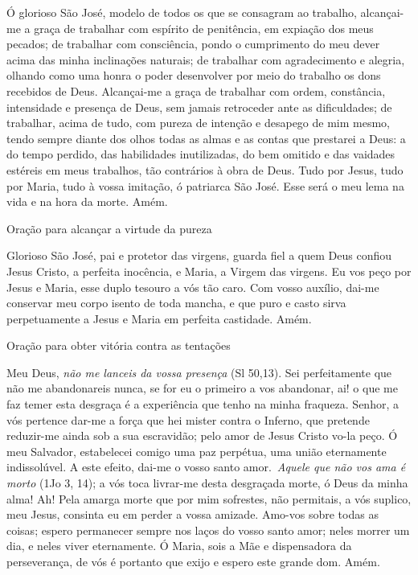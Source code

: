 \documentclass{book}
\begin{document}
\begin{flushleft}
    Ó glorioso São José, modelo de todos os que se consagram ao trabalho, alcançai-me a graça de trabalhar com espírito de penitência, em expiação dos meus pecados; de trabalhar com consciência, pondo o cumprimento do meu dever acima das minha inclinações naturais; de trabalhar com agradecimento e alegria, olhando como uma honra o poder desenvolver por meio do trabalho os dons recebidos de Deus. Alcançai-me a graça de trabalhar com ordem, constância, intensidade e presença de Deus, sem jamais retroceder ante as dificuldades; de trabalhar, acima de tudo, com pureza de intenção e desapego de mim mesmo, tendo sempre diante dos olhos todas as almas e as contas que prestarei a Deus: a do tempo perdido, das habilidades inutilizadas, do bem omitido e das vaidades estéreis em meus trabalhos, tão contrários à obra de Deus. Tudo por Jesus, tudo por Maria, tudo à vossa imitação, ó patriarca São José. Esse será o meu lema na vida e na hora da morte. Amém.
\end{flushleft}
\begin{center}
    Oração para alcançar a virtude da pureza
\end{center}
\begin{flushleft}
    Glorioso São José, pai e protetor das virgens, guarda fiel a quem Deus confiou Jesus Cristo, a perfeita inocência, e Maria, a Virgem das virgens. Eu vos peço por Jesus e Maria, esse duplo tesouro a vós tão caro. Com vosso auxílio, dai-me conservar meu corpo isento de toda mancha, e que puro e casto sirva perpetuamente a Jesus e Maria em perfeita castidade. Amém.
\end{flushleft}
\begin{center}
    Oração para obter vitória contra as tentações
\end{center}
\begin{flushleft}
    Meu Deus, \textit{não me lanceis da vossa presença} (\textcolor{VioletRed2}{Sl 50,13}). Sei perfeitamente que não me abandonareis nunca, se for eu o primeiro a vos abandonar, ai! o que me faz temer esta desgraça é a experiência que tenho na minha fraqueza. Senhor, a vós pertence dar-me a força que hei mister contra o Inferno, que pretende reduzir-me ainda sob a sua escravidão; pelo amor de Jesus Cristo vo-la peço. Ó meu Salvador, estabelecei comigo uma paz perpétua, uma união eternamente indissolúvel. A este efeito, dai-me o vosso santo amor.\ \textit{Aquele que não vos ama é morto} (\textcolor{VioletRed2}{1Jo 3, 14}); a vós toca livrar-me desta desgraçada morte, ó Deus da minha alma! Ah! Pela amarga morte que por mim sofrestes, não permitais, a vós suplico, meu Jesus, consinta eu em perder a vossa amizade. Amo-vos sobre todas as coisas; espero permanecer sempre nos laços do vosso santo amor; neles morrer um dia, e neles viver eternamente. Ó Maria, sois a Mãe e dispensadora da perseverança, de vós é portanto que exijo e espero este grande dom. Amém.
\end{flushleft}
\end{document}
